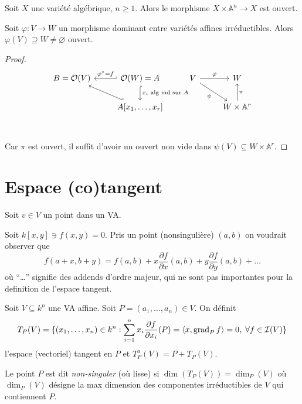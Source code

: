 \begin{eser}{}
    Soit \(X\) une variété algébrique, \(n \ge 1\). Alors le morphisme \(X
    \times \mathbb{A}^{n} \to X\) est ouvert.
    \tcblower

\end{eser}
\begin{lemma}{}
    Soit \(\varphi  : V \to W\) un morphisme dominant entre variétés affines
    irréductibles. Alors \(\varphi {(V)} \supseteq W \neq \varnothing\) ouvert.
\end{lemma}
\begin{proof}{}
\[
\begin{tikzcd}
	B = \mathcal{O}{(V)} & \mathcal{O}{(W)} = A & V & W \\
                         & A[x_{1},\dots, x_{r}] && W \times \mathbb{A}^{r}\\
	\arrow["{\varphi^*=f}"', hook', from=1-2, to=1-1]
	\arrow["x_{i} \text{ alg ind sur \(A\)}", hook, from=1-2, to=2-2]
	\arrow["\varphi", from=1-3, to=1-4]
	\arrow["\psi"', from=1-3, to=2-4]
	\arrow[hook', from=2-2, to=1-1]
	\arrow["\pi"', from=2-4, to=1-4]
\end{tikzcd}
\] 
    Car \(\pi\) est ouvert, il suffit d'avoir un ouvert non vide dans
    \(\psi{(V)} \subseteq W \times \mathbb{A}^{r}\).
\end{proof}

\section{Espace (co)tangent}

Soit \(v \in V\) un point dans un VA.

\begin{example}
    Soit \(k[x,y] \ni f{(x, y)} = 0\). Pris un point (nonsingulière) \({(a,
    b)}\) on voudrait observer que
    \[
      f{(a + x, b + y)} = f{(a,b)} + x \frac{\partial f}{\partial x}{(a,b)} + y
      \frac{\partial f}{\partial y}{(a,b)} + \dots
    \]
    où ``\dots'' signifie des addends d'ordre majeur, qui ne sont pas
    importantes pour la definition de l'espace tangent.
\end{example}

\begin{definition}{}
    Soit \(V \subseteq k^{n} \) une VA affine. Soit \(P = {(a_{1}, \dots,
    a_{n})} \in V\). On définit 
    \[
      T_P{(V)} = \{{(x_{1}, \dots, x_{n})} \in k^{n} : \sum_{i=1}^{n} x_{i}
      \frac{\partial f}{\partial x_{i}} {(P)} = {\left\langle x, \mathrm{grad}_P\,f\right\rangle} =0
      ,\; \forall f \in \mathcal{I}{(V)}  \} 
    \]
    l'espace (vectoriel) tangent en \(P\) et \(T_P^{a} {(V)} = P + T_P{(V)}\).

    Le point \(P\) est dit \emph{non-singuler} (où lisse) si \(\dim {(T_P{(V)})}
    = \dim_P{(V)}\) où \(\dim_P{(V)}\) désigne la max dimension des componentes
    irréductibles de \(V\) qui contiennent \(P\).
\end{definition}

